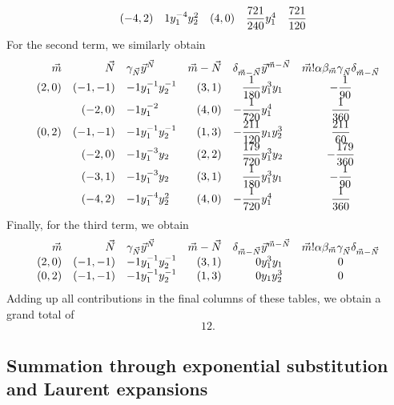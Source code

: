 \begin{example}
{$$\begin{array}{rrr@{}lrr@{}lc}
\\
      & (-4,2) & 1 & y_1^{-4} y_2^2 & (4,0)
		& \displaystyle\frac{721}{240} & y_1^4
		& \displaystyle\frac{721}{120}
\end{array}
$$
}%
For the second term, we similarly obtain
{\renewcommand\arraystretch{2}
$$
\begin{array}{rrr@{}lrr@{}lc}
\vec m & \vec N & \gamma_{\vec N} & \vec y^{\vec N} &
\vec m - \vec N & \delta_{\vec m - \vec N} & \vec y^{\vec m - \vec N} &
\vec m! \alpha \beta_{\vec m} \gamma_{\vec N} \delta_{\vec m - \vec N}
\\
(2,0) & (-1,-1) & -1 & y_1^{-1} y_2^{-1} & (3,1)
		& \displaystyle\frac{1}{180} & y_1^3 y_1
		& \displaystyle-\frac{1}{90}
\\
      & (-2,0) & -1 & y_1^{-2} & (4,0)
		& \displaystyle-\frac{1}{720} & y_1^4
		& \displaystyle\frac{1}{360}
\\
(0,2) & (-1,-1) & -1 & y_1^{-1} y_2^{-1} & (1,3)
		& \displaystyle-\frac{211}{120} & y_1 y_2^3
		& \displaystyle\frac{211}{60}
\\
      & (-2,0) & -1 & y_1^{-3} y_2 & (2,2)
		& \displaystyle\frac{179}{720} & y_1^3 y_2
		& \displaystyle-\frac{179}{360}
\\
      & (-3,1) & -1 & y_1^{-3} y_2 & (3,1)
		& \displaystyle\frac{1}{180} & y_1^3 y_1
		& \displaystyle-\frac{1}{90}
\\
      & (-4,2) & -1 & y_1^{-4} y_2^2 & (4,0)
		& \displaystyle-\frac{1}{720} & y_1^4
		& \displaystyle\frac{1}{360}
\end{array}
$$
}%
Finally, for the third term, we obtain
$$
\begin{array}{rrr@{}lrr@{}lc}
\vec m & \vec N & \gamma_{\vec N} & \vec y^{\vec N} &
\vec m - \vec N & \delta_{\vec m - \vec N} & \vec y^{\vec m - \vec N} &
\vec m! \alpha \beta_{\vec m} \gamma_{\vec N} \delta_{\vec m - \vec N}
\\
(2,0) & (-1,-1) & -1 & y_1^{-1} y_2^{-1} & (3,1)
		& 0 & y_1^3 y_1
		& 0
\\
(0,2) & (-1,-1) & -1 & y_1^{-1} y_2^{-1} & (1,3)
		& 0 & y_1 y_2^3
		& 0
\end{array}
$$
Adding up all contributions in the final columns of these tables,
we obtain a grand total of
$$
12.
$$
\end{example}

\subsection{Summation through exponential substitution and Laurent expansions}
\label{s:laurent}

